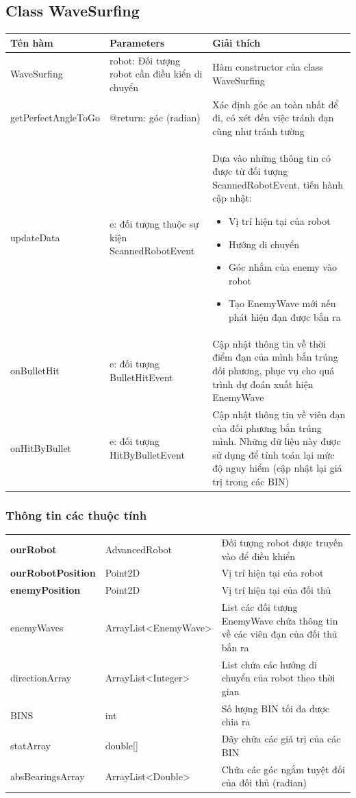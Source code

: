 \documentclass[14pt]{article}
\begin{document}
\subsection{Class WaveSurfing}
\begin{tabular}{|p{4cm}|p{6cm}|p{6cm}|}
\hline
\bf Tên hàm&\bf Parameters&\bf Giải thích\\
\hline
WaveSurfing&robot: Đối tượng robot cần điều kiển di chuyển& Hàm constructor của class WaveSurfing\\
\hline
getPerfectAngleToGo&@return: góc (radian)& Xác định góc an toàn nhất để đi, có xét đến việc tránh đạn cũng như tránh tường\\
\hline
updateData&e: đối tượng thuộc sự kiện ScannedRobotEvent&Dựa vào những thông tin có được từ đối tượng ScannedRobotEvent, tiến hành cập nhật:
	\begin{itemize}
		\item Vị trí hiện tại của robot
		\item Hướng di chuyển
		\item Góc nhắm của enemy vào robot
		\item Tạo EnemyWave mới nếu phát hiện đạn được bắn ra
	\end{itemize}\\
\hline
onBulletHit&e: đối tượng BulletHitEvent& Cập nhật thông tin về thời điểm đạn của mình bắn trúng đối phương, phục vụ cho quá trình dự đoán xuất hiện EnemyWave\\
\hline
onHitByBullet&e: đối tượng HitByBulletEvent& Cập nhật thông tin về viên đạn của đối phương bắn trúng mình. Những dữ liệu này được sử dụng để tính toán lại mức độ nguy hiểm (cập nhật lại giá trị trong các BIN)\\
\hline

\end{tabular}

\subsubsection*{Thông tin các thuộc tính}

\begin{tabular}{llp{9cm}}
\textbf{ourRobot}&AdvancedRobot&Đối tượng robot được truyền vào để điều khiển\\
\textbf{ourRobotPosition}&Point2D&Vị trí hiện tại của robot\\
\textbf{enemyPosition}&Point2D&Vị trí hiện tại của đối thủ\\
enemyWaves&ArrayList<EnemyWave>&List các đối tượng EnemyWave chứa thông tin về các viên đạn của đối thủ bắn ra\\
directionArray&ArrayList<Integer>&List chứa các hướng di chuyển của robot theo thời gian\\
BINS&int&Số lượng BIN tối đa được chia ra\\
statArray&double[]&Dãy chứa các giá trị của các BIN\\
absBearingsArray&ArrayList<Double>&Chứa các góc ngắm tuyệt đối của đối thủ (radian)\\
\end{tabular}
\end{document}
